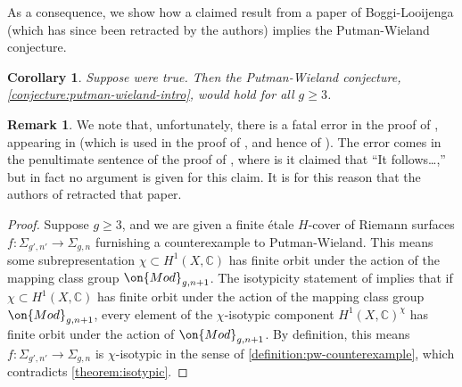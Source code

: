 \documentclass[12 pt]{amsart}
\theoremstyle{plain}
\newtheorem{corollary}[subsection]{Corollary}
\theoremstyle{definition}
\newtheorem{remark}[subsection]{Remark}
\theoremstyle{remark}
\numberwithin{equation}{section}
\begin{document}
As a consequence, we show how a claimed result from a paper of Boggi-Looijenga (which has since been retracted by the authors) implies the
Putman-Wieland conjecture.

\begin{corollary}
	\label{corollary:boggi-looijenga}
	Suppose \cite[Theorem
	B(i)]{boggiL:curves-with-prescribed-symmetry} were
	true.
	Then the Putman-Wieland conjecture,
	\autoref{conjecture:putman-wieland-intro}, would hold for all
	 $g \geq 3$.
\end{corollary}
\begin{remark}
	\label{remark:}
	We note that, unfortunately, there is a fatal error in the
	proof of \cite[Theorem
	B(i)]{boggiL:curves-with-prescribed-symmetry},
	appearing in \cite[Lemma 1.6]{boggiL:curves-with-prescribed-symmetry}
	(which is used in the proof of 
\cite[Theorem 1.1]{boggiL:curves-with-prescribed-symmetry},
and hence of
\cite[Theorem B(i)]{boggiL:curves-with-prescribed-symmetry}).
The error comes in the penultimate sentence of the proof of \cite[Lemma
1.6]{boggiL:curves-with-prescribed-symmetry},
where is it claimed
that ``It follows\dots,'' but in fact no argument is given for this claim. It is for this reason that the authors of \cite{boggiL:curves-with-prescribed-symmetry} retracted that paper.
\end{remark}


\begin{proof}
	Suppose $g \geq 3$, and we are
	given a finite \'etale $H$-cover of Riemann surfaces
	$f: \Sigma_{g',n'} \to \Sigma_{g,n}$ furnishing a counterexample to
	Putman-Wieland.
	This means some 
	subrepresentation $\chi \subset H^1(X, \mathbb
	C)$ has finite orbit under the action of the mapping class group
	$\on{Mod}_{g,n+1}$.
	The isotypicity statement of 	
	\cite[Theorem B(i)]{boggiL:curves-with-prescribed-symmetry}
	implies that if $\chi \subset H^1(X, \mathbb
	C)$ has finite orbit under the action of the mapping class group
	$\on{Mod}_{g,n+1}$, 
	every element of the $\chi$-isotypic component
	$H^1(X, \mathbb C)^\chi$ has finite orbit under the action of 
	$\on{Mod}_{g,n+1}$.	
	By definition, this means
	$f: \Sigma_{g',n'} \to \Sigma_{g,n}$ is $\chi$-isotypic
	in the sense of \autoref{definition:pw-counterexample},
	which contradicts \autoref{theorem:isotypic}.
\end{proof}
\end{document}
